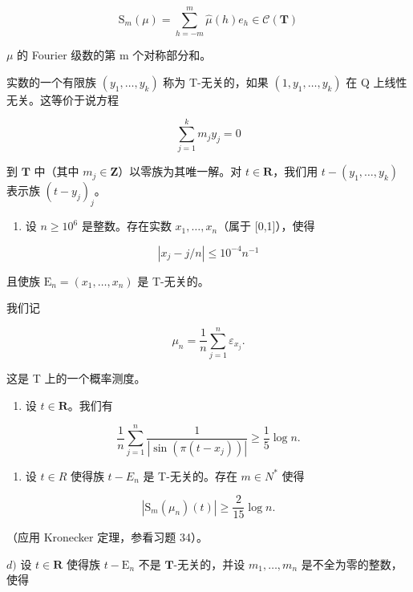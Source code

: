 \[
\mathrm{S} _ {m} (\mu) = \sum_ {h = - m} ^ {m} \widehat {\mu} (h) e _ {h} \in \mathcal {C} (\mathbf {T})
\]

\(\mu\) 的 Fourier 级数的第 m 个对称部分和。

实数的一个有限族 \((y_{1},\ldots,y_{k})\) 称为 T-无关的，如果 \((1,y_{1},\ldots,y_{k})\) 在 Q 上线性无关。这等价于说方程

\[
\sum_ {j = 1} ^ {k} m _ {j} y _ {j} = 0
\]

到 \(\mathbf{T}\) 中（其中 \(m_j \in \mathbf{Z}\)）以零族为其唯一解。对 \(t \in \mathbf{R}\)，我们用 \(t - (y_1, \ldots, y_k)\) 表示族 \((t - y_j)_j\)。

\begin{enumerate}
\def\labelenumi{\alph{enumi})}
\tightlist
\item
  设 \(n \geqslant 10^{6}\) 是整数。存在实数 \(x_{1}, \ldots, x_{n}\)（属于 {[}0,1{]}），使得
\end{enumerate}

\[
\left| x _ {j} - j / n \right| \leqslant 1 0 ^ {- 4} n ^ {- 1}
\]

且使族 \(\mathrm{E}_{n}=(x_{1},\ldots,x_{n})\) 是 T-无关的。

我们记

\[
\mu_ {n} = \frac {1}{n} \sum_ {j = 1} ^ {n} \varepsilon_ {x _ {j}}.
\]

这是 T 上的一个概率测度。

\begin{enumerate}
\def\labelenumi{\alph{enumi})}
\setcounter{enumi}{1}
\tightlist
\item
  设 \(t\in \mathbf{R}\)。我们有
\end{enumerate}

\[
\frac {1}{n} \sum_ {j = 1} ^ {n} \frac {1}{| \sin (\pi (t - x _ {j})) |} \geqslant \frac {1}{5} \log n.
\]

\begin{enumerate}
\def\labelenumi{\alph{enumi})}
\setcounter{enumi}{2}
\tightlist
\item
  设 \(t \in R\) 使得族 \(t - E_{n}\) 是 T-无关的。存在 \(m \in N^{*}\) 使得
\end{enumerate}

\[
| \mathrm{S} _ {m} (\mu_ {n}) (t) | \geqslant \frac {2}{1 5} \log n.
\]

（应用 Kronecker 定理，参看习题 34）。

\(d)\) 设 \(t \in \mathbf{R}\) 使得族 \(t - \mathrm{E}_n\) 不是 \(\mathbf{T}\)-无关的，并设 \(m_1, \ldots, m_n\) 是不全为零的整数，使得


